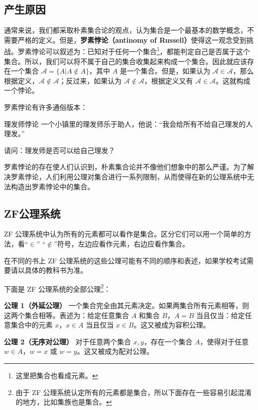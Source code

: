 \begin{issues}
\issueTODO
\end{issues}

\subsection{产生原因}
通常来说，我们都采取朴素集合论的观点，认为集合是一个最基本的数学概念，不需要严格的定义。但是，\textbf{罗素悖论（antinomy of Russell）}使得这一观念受到挑战。罗素悖论可以叙述为：已知对于任何一个集合\footnote{这里把集合也看成元素。}，都能判定自己是否属于这个集合。所以，我们可以将不属于自己的集合收集起来构成一个集合。因此就应该存在一个集合 $\mathcal{A}=\{A|A\notin A\}$，其中 $A$ 是一个集合。但是，如果认为 $\mathcal{A}\in\mathcal{A}$，那么根据定义，$\mathcal{A}\notin\mathcal{A}$；反过来，如果认为 $\mathcal{A}\notin\mathcal{A}$，根据定义又有 $\mathcal{A}\in\mathcal{A}$。这就构成一个悖论。

罗素悖论有许多通俗版本：
\begin{example}{理发师悖论}
一个小镇里的理发师乐于助人，他说：“我会给所有不给自己理发的人理发。”

请问：理发师是否可以给自己理发？
\end{example}

罗素悖论的存在使人们认识到，朴素集合论并不像他们想象中的那么严谨。为了解决罗素悖论，人们利用公理对集合进行一系列限制，从而使得在新的公理系统中无法构造出罗素悖论中的集合。

\subsection{ZF公理系统}
ZF 公理系统中认为所有的元素都可以看作是集合。区分它们可以用一个简单的方法，看“$\in$” “$\notin$”符号，左边应看作元素，右边应看作集合。

在不同的书上 ZF 公理系统的这些公理可能有不同的顺序和表述，如果学校考试需要请以具体的教科书为准。

下面是 ZF 公理系统的全部公理\footnote{由于 ZF 公理系统认定所有的元素都是集合，所以下面存在一些容易引起混淆的地方，比如集族也是集合。}：

\textbf{公理 1（外延公理）} 一个集合完全由其元素决定。如果两集合所有元素相等，则这两个集合相等。表述为：给定任意集合 $A$ 和集合 $B$，$A=B$ 当且仅当：给定任意集合中的元素 $x$，$x \in A$ 当且仅当 $x \in B$。这又被成为容积公理。

\textbf{公理 2（无序对公理）} 对于任意两个集合 $x,y$，存在一个集合 $A$，使得对于任意 $w\in A$，$w=x$ 或 $w=y$。这又被成为配对公理。

